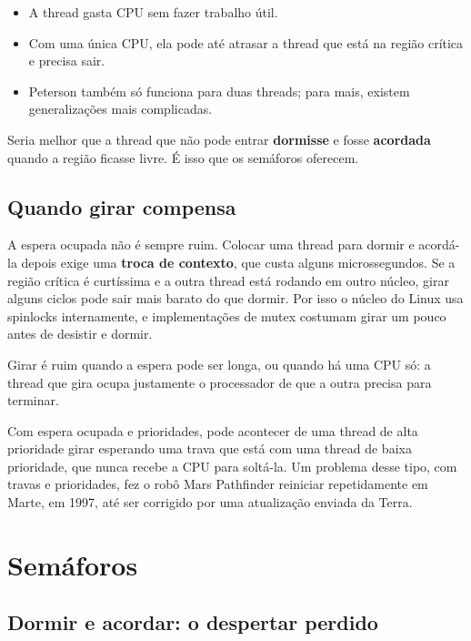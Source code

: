 \documentclass[11pt,a4paper]{article}
\begin{document}
\begin{itemize}
    \item A thread gasta CPU sem fazer trabalho útil.
    \item Com uma única CPU, ela pode até atrasar a thread que está na região crítica e precisa sair.
    \item Peterson também só funciona para duas threads; para mais, existem generalizações mais complicadas.
\end{itemize}

Seria melhor que a thread que não pode entrar \textbf{dormisse} e fosse \textbf{acordada} quando a região ficasse livre. É isso que os semáforos oferecem.

\subsection{Quando girar compensa}

A espera ocupada não é sempre ruim. Colocar uma thread para dormir e acordá-la depois exige uma \textbf{troca de contexto}, que custa alguns microssegundos. Se a região crítica é curtíssima e a outra thread está rodando em outro núcleo, girar alguns ciclos pode sair mais barato do que dormir. Por isso o núcleo do Linux usa spinlocks internamente, e implementações de mutex costumam girar um pouco antes de desistir e dormir.

Girar é ruim quando a espera pode ser longa, ou quando há uma CPU só: a thread que gira ocupa justamente o processador de que a outra precisa para terminar.

\begin{alerta}
Com espera ocupada e prioridades, pode acontecer de uma thread de alta prioridade girar esperando uma trava que está com uma thread de baixa prioridade, que nunca recebe a CPU para soltá-la. Um problema desse tipo, com travas e prioridades, fez o robô Mars Pathfinder reiniciar repetidamente em Marte, em 1997, até ser corrigido por uma atualização enviada da Terra.
\end{alerta}

\section{Semáforos}

\subsection{Dormir e acordar: o despertar perdido}
\end{document}
